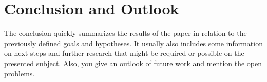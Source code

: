 \chapter{Conclusion and Outlook}
The conclusion quickly summarizes the results of the paper in relation to the previously defined goals and hypotheses. 
It usually also includes some information on next steps and further research that might be required or possible on the presented subject.
Also, you give an outlook of future work and mention the open problems.
\newpage
